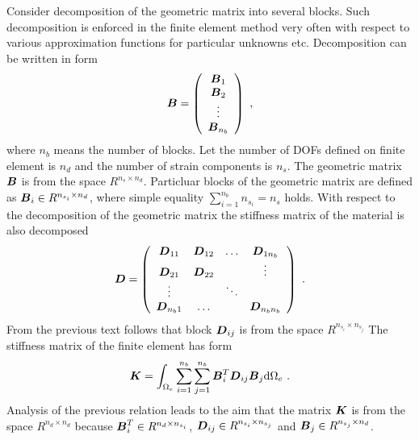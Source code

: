 Consider decomposition of the geometric matrix into several blocks. Such decomposition is enforced
in the finite element method very often with respect to various approximation functions for particular
unknowns etc. Decomposition can be written in form
\begin{equation}
\mbox{\boldmath$B$} = \left(\begin{array}{c}
\mbox{\boldmath$B$}_1
\\
\mbox{\boldmath$B$}_2
\\
\vdots
\\
\mbox{\boldmath$B$}_{n_b}
\end{array}\right)\ ,
\end{equation}
where $n_b$ means the number of blocks.
Let the number of DOFs defined on finite element is $n_d$ and the number of strain components is $n_s$.
The geometric matrix $\mbox{\boldmath$B$}$ is from the space $R^{n_s \times n_d}$. Particluar blocks of the geometric
matrix are defined as $\mbox{\boldmath$B$}_i \in R^{n_{s_i} \times n_d}$, where simple equality
$\sum_{i=1}^{n_b} n_{s_i} = n_s$ holds. With respect to the decomposition of the geometric matrix the
stiffness matrix of the material is also decomposed
\begin{equation}
\mbox{\boldmath$D$} = \left(\begin{array}{cccc}
\mbox{\boldmath$D$}_{11}    & \mbox{\boldmath$D$}_{12} & \ldots & \mbox{\boldmath$D$}_{1n_b}
\\
\mbox{\boldmath$D$}_{21}    & \mbox{\boldmath$D$}_{22} &        & \vdots
\\
\vdots          &              & \ddots &
\\
\mbox{\boldmath$D$}_{n_b 1} & \ldots       &        & \mbox{\boldmath$D$}_{n_b n_b}
\end{array}\right)\ .
\end{equation}
From the previous text follows that block $\mbox{\boldmath$D$}_{ij}$ is from the space $R^{n_{s_i} \times n_{s_j}}$
The stiffness matrix of the finite element has form
\begin{equation}\label{eqstiffmatblock}
\mbox{\boldmath$K$} = \int_{\Omega_e} \sum_{i=1}^{n_b} \sum_{j=1}^{n_b} \mbox{\boldmath$B$}_i^T \mbox{\boldmath$D$}_{ij} \mbox{\boldmath$B$}_j {\rm d}\Omega_e\ .
\end{equation}
Analysis of the previous relation leads to the aim that the matrix $\mbox{\boldmath$K$}$ is from the space $R^{n_d \times n_d}$
because $\mbox{\boldmath$B$}_i^T \in R^{n_d \times n_{s_i}}$, $\mbox{\boldmath$D$}_{ij} \in R^{n_{s_i} \times n_{s_j}}$ and
$\mbox{\boldmath$B$}_j \in R^{n_{s_j} \times n_d}$.


